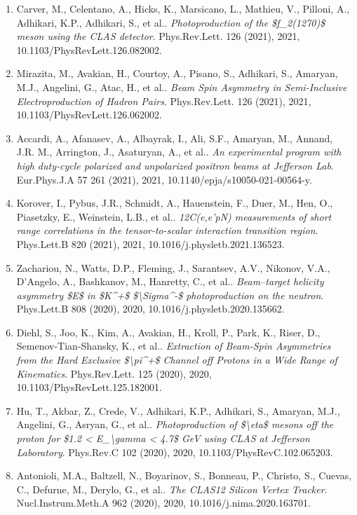 \begin{enumerate}
\item Carver, M., Celentano, A., Hicks, K., Marsicano, L., Mathieu, V., Pilloni, A., Adhikari, K.P., Adhikari, S., et al.. \textit{Photoproduction of the \$f\_2(1270)\$ meson using the CLAS detector}. Phys.Rev.Lett. 126 (2021), 2021, 10.1103/PhysRevLett.126.082002.
\item Mirazita, M., Avakian, H., Courtoy, A., Pisano, S., Adhikari, S., Amaryan, M.J., Angelini, G., Atac, H., et al.. \textit{Beam Spin Asymmetry in Semi-Inclusive Electroproduction of Hadron Pairs}. Phys.Rev.Lett. 126 (2021), 2021, 10.1103/PhysRevLett.126.062002.
\item Accardi, A., Afanasev, A., Albayrak, I., Ali, S.F., Amaryan, M., Annand, J.R. M., Arrington, J., Asaturyan, A., et al.. \textit{An experimental program with high duty-cycle polarized and unpolarized positron beams at Jefferson Lab}. Eur.Phys.J.A 57 261 (2021), 2021, 10.1140/epja/s10050-021-00564-y.
\item Korover, I., Pybus, J.R., Schmidt, A., Hauenstein, F., Duer, M., Hen, O., Piasetzky, E., Weinstein, L.B., et al.. \textit{12C(e,e'pN) measurements of short range correlations in the tensor-to-scalar interaction transition region}. Phys.Lett.B 820 (2021), 2021, 10.1016/j.physletb.2021.136523.
\item Zachariou, N., Watts, D.P., Fleming, J., Sarantsev, A.V., Nikonov, V.A., D'Angelo, A., Bashkanov, M., Hanretty, C., et al.. \textit{Beam–target helicity asymmetry \$E\$ in \$K\textasciicircum{}+\$ \$\textbackslash{}Sigma\textasciicircum{}-\$ photoproduction on the neutron}. Phys.Lett.B 808 (2020), 2020, 10.1016/j.physletb.2020.135662.
\item Diehl, S., Joo, K., Kim, A., Avakian, H., Kroll, P., Park, K., Riser, D., Semenov-Tian-Shansky, K., et al.. \textit{Extraction of Beam-Spin Asymmetries from the Hard Exclusive \$\textbackslash{}pi\textasciicircum{}+\$ Channel off Protons in a Wide Range of Kinematics}. Phys.Rev.Lett. 125 (2020), 2020, 10.1103/PhysRevLett.125.182001.
\item Hu, T., Akbar, Z., Crede, V., Adhikari, K.P., Adhikari, S., Amaryan, M.J., Angelini, G., Asryan, G., et al.. \textit{Photoproduction of \$\textbackslash{}eta\$ mesons off the proton for \$1.2 < E\_\textbackslash{}gamma < 4.7\$ GeV using CLAS at Jefferson Laboratory}. Phys.Rev.C 102 (2020), 2020, 10.1103/PhysRevC.102.065203.
\item Antonioli, M.A., Baltzell, N., Boyarinov, S., Bonneau, P., Christo, S., Cuevas, C., Defurne, M., Derylo, G., et al.. \textit{The CLAS12 Silicon Vertex Tracker}. Nucl.Instrum.Meth.A 962 (2020), 2020, 10.1016/j.nima.2020.163701.

\end{enumerate}
